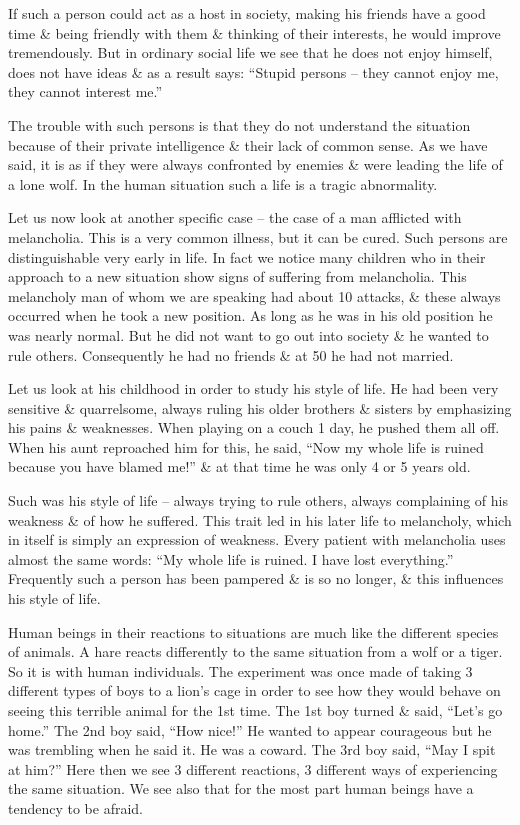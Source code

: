 \documentclass{article}
\begin{document}
If such a person could act as a host in society, making his friends have a good time \& being friendly with them \& thinking of their interests, he would improve tremendously. But in ordinary social life we see that he does not enjoy himself, does not have ideas \& as a result says: ``Stupid persons -- they cannot enjoy me, they cannot interest me.''

The trouble with such persons is that they do not understand the situation because of their private intelligence \& their lack of common sense. As we have said, it is as if they were always confronted by enemies \& were leading the life of a lone wolf. In the human situation such a life is a tragic abnormality.

Let us now look at another specific case -- the case of a man afflicted with melancholia. This is a very common illness, but it can be cured. Such persons are distinguishable very early in life. In fact we notice many children who in their approach to a new situation show signs of suffering from melancholia. This melancholy man of whom we are speaking had about 10 attacks, \& these always occurred when he took a new position. As long as he was in his old position he was nearly normal. But he did not want to go out into society \& he wanted to rule others. Consequently he had no friends \& at 50 he had not married.

Let us look at his childhood in order to study his style of life. He had been very sensitive \& quarrelsome, always ruling his older brothers \& sisters by emphasizing his pains \& weaknesses. When playing on a couch 1 day, he pushed them all off. When his aunt reproached him for this, he said, ``Now my whole life is ruined because you have blamed me!'' \& at that time he was only 4 or 5 years old.

Such was his style of life -- always trying to rule others, always complaining of his weakness \& of how he suffered. This trait led in his later life to melancholy, which in itself is simply an expression of weakness. Every patient with melancholia uses almost the same words: ``My whole life is ruined. I have lost everything.'' Frequently such a person has been pampered \& is so no longer, \& this influences his style of life.

Human beings in their reactions to situations are much like the different species of animals. A hare reacts differently to the same situation from a wolf or a tiger. So it is with human individuals. The experiment was once made of taking 3 different types of boys to a lion's cage in order to see how they would behave on seeing this terrible animal for the 1st time. The 1st boy turned \& said, ``Let's go home.'' The 2nd boy said, ``How nice!'' He wanted to appear courageous but he was trembling when he said it. He was a coward. The 3rd boy said, ``May I spit at him?'' Here then we see 3 different reactions, 3 different ways of experiencing the same situation. We see also that for the most part human beings have a tendency to be afraid.
\end{document}
